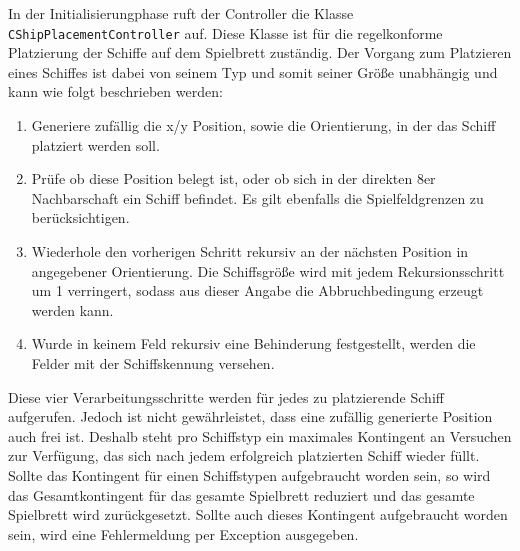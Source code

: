 In der Initialisierungphase ruft der Controller die Klasse \texttt{CShipPlacementController} auf.
Diese Klasse ist für die regelkonforme Platzierung der Schiffe auf dem Spielbrett zuständig.
Der Vorgang zum Platzieren eines Schiffes ist dabei von seinem Typ und somit seiner Größe unabhängig und kann wie folgt beschrieben werden:
\begin{enumerate}
	\item Generiere zufällig die x/y Position, sowie die Orientierung, in der das Schiff platziert werden soll.
	\item Prüfe ob diese Position belegt ist, oder ob sich in der direkten 8er Nachbarschaft ein Schiff befindet. 
	Es gilt ebenfalls die Spielfeldgrenzen zu berücksichtigen.
	\item Wiederhole den vorherigen Schritt rekursiv an der nächsten Position in angegebener Orientierung. 
	Die Schiffsgröße wird mit jedem Rekursionsschritt um 1 verringert, sodass aus dieser Angabe die Abbruchbedingung erzeugt werden kann.
	\item Wurde in keinem Feld rekursiv eine Behinderung festgestellt, werden die Felder mit der Schiffskennung versehen.
\end{enumerate}
Diese vier Verarbeitungsschritte werden für jedes zu platzierende Schiff aufgerufen.
Jedoch ist nicht gewährleistet, dass eine zufällig generierte Position auch frei ist.
Deshalb steht pro Schiffstyp ein maximales Kontingent an Versuchen zur Verfügung, das sich nach jedem erfolgreich platzierten Schiff wieder füllt.
Sollte das Kontingent für einen Schiffstypen aufgebraucht worden sein, so wird das Gesamtkontingent für das gesamte Spielbrett reduziert und das gesamte Spielbrett wird zurückgesetzt.
Sollte auch dieses Kontingent aufgebraucht worden sein, wird eine Fehlermeldung per Exception ausgegeben.